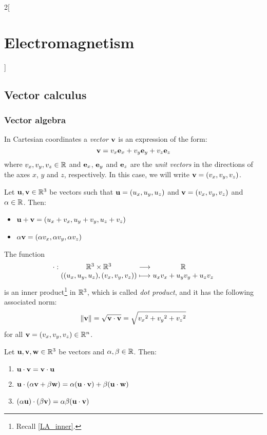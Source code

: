 \documentclass[../../../main.tex]{subfiles}
\begin{document}
\begin{multicols}{2}[\section{Electromagnetism}]
  \subsection{Vector calculus}
  \subsubsection{Vector algebra}
  \begin{definition}
    In Cartesian coordinates a \emph{vector} $\boldsymbol{\mathrm{v}}$ is an expression of the form: $$\boldsymbol{\mathrm{v}}=v_x\boldsymbol{\mathrm{e}}_x+v_y\boldsymbol{\mathrm{e}}_y+v_z\boldsymbol{\mathrm{e}}_z$$
    where $v_x,v_y,v_z\in\mathbb{R}$ and $\boldsymbol{\mathrm{e}}_x$, $\boldsymbol{\mathrm{e}}_y$ and $\boldsymbol{\mathrm{e}}_z$ are the \emph{unit vectors} in the directions of the axes $x$, $y$ and $z$, respectively. In this case, we will write $\boldsymbol{\mathrm{v}}=(v_x,v_y,v_z)$.
  \end{definition}
  \begin{prop}
    Let $\boldsymbol{\mathrm{u}},\boldsymbol{\mathrm{v}}\in\mathbb{R}^3$ be vectors such that $\boldsymbol{\mathrm{u}}=(u_x,u_y,u_z)$ and $\boldsymbol{\mathrm{v}}=(v_x,v_y,v_z)$ and $\alpha\in\mathbb{R}$. Then:
    \begin{itemize}
      \item $\boldsymbol{\mathrm{u}}+\boldsymbol{\mathrm{v}}=(u_x+v_x,u_y+v_y,u_z+v_z)$
      \item $\alpha\boldsymbol{\mathrm{v}}=(\alpha v_x,\alpha v_y,\alpha v_z)$
    \end{itemize}
  \end{prop}
  \begin{prop}
    The function $$\function{\cdot}{\RR^3\times\RR^3}{\RR}{((u_x,u_y,u_z),(v_x,v_y,v_z))}{u_xv_x+u_yv_y+u_zv_z}$$ is an inner product\footnote{Recall \cref{LA_inner}.} in $\mathbb{R}^3$, which is called \emph{dot product}, and it has the following associated norm: $$\|\boldsymbol{\mathrm{v}}\|=\sqrt{\boldsymbol{\mathrm{v}}\cdot\boldsymbol{\mathrm{v}}}=\sqrt{{v_x}^2+{v_y}^2+{v_z}^2}$$ for all $\boldsymbol{\mathrm{v}}=(v_x,v_y,v_z)\in\mathbb{R}^n$.
  \end{prop}
  \begin{prop}
    Let $\boldsymbol{\mathrm{u}},\boldsymbol{\mathrm{v}},\boldsymbol{\mathrm{w}}\in\mathbb{R}^3$ be vectors and $\alpha,\beta \in\mathbb{R}$. Then:
    \begin{enumerate}
      \item $\boldsymbol{\mathrm{u}}\cdot\boldsymbol{\mathrm{v}}=\boldsymbol{\mathrm{v}}\cdot\boldsymbol{\mathrm{u}}$
      \item $\boldsymbol{\mathrm{u}}\cdot(\alpha\boldsymbol{\mathrm{v}}+\beta\boldsymbol{\mathrm{w}})=\alpha(\boldsymbol{\mathrm{u}}\cdot\boldsymbol{\mathrm{v}})+\beta(\boldsymbol{\mathrm{u}}\cdot\boldsymbol{\mathrm{w}})$
      \item $(\alpha\boldsymbol{\mathrm{u}})\cdot(\beta\boldsymbol{\mathrm{v}})=\alpha\beta(\boldsymbol{\mathrm{u}}\cdot\boldsymbol{\mathrm{v}})$

\end{enumerate}
\end{prop}
\end{multicols}
\end{document}
